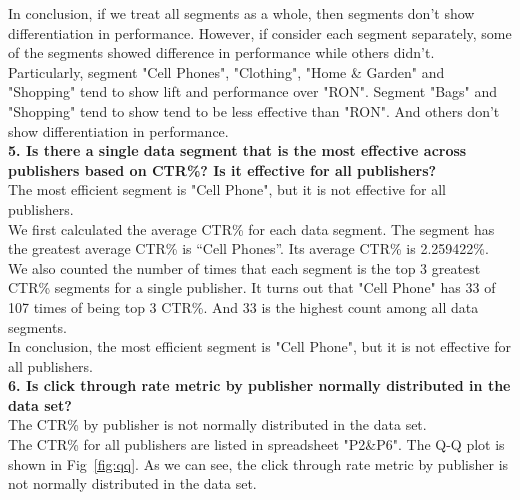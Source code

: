 \documentclass[12pt]{article}
\begin{document}
In conclusion, if we treat all segments as a whole, then segments don't show differentiation in performance. However, if consider each segment separately, some of the segments showed difference in performance while others didn't. \\

Particularly, segment "Cell Phones", "Clothing", "Home \& Garden" and "Shopping" tend to show lift and performance over "RON". Segment "Bags" and "Shopping" tend to show tend to be less effective than "RON". And others don't show differentiation in performance. \\

{\bf 5.	Is there a single data segment that is the most effective across publishers based on CTR\%? Is it effective for all publishers?} \\

The most efficient segment is "Cell Phone", but it is not effective for all publishers. \\

We first calculated the average CTR\% for each data segment. The segment has the greatest average CTR\% is ``Cell Phones''. Its average CTR\% is 2.259422\%. \\

We also counted the number of times that each segment is the top 3 greatest CTR\% segments for a single publisher. It turns out that "Cell Phone" has 33 of 107 times of being top 3 CTR\%. And 33 is the highest count among all data segments. \\

In conclusion, the most efficient segment is "Cell Phone", but it is not effective for all publishers. \\

{\bf 6. Is click through rate metric by publisher normally distributed in the data set?} \\

The CTR\% by publisher is not normally distributed in the data set. \\

The CTR\% for all publishers are listed in spreadsheet "P2\&P6". The Q-Q plot is shown in Fig~\ref{fig:qq}. As we can see, the click through rate metric by publisher is not normally distributed in the data set. \\
\end{document}
